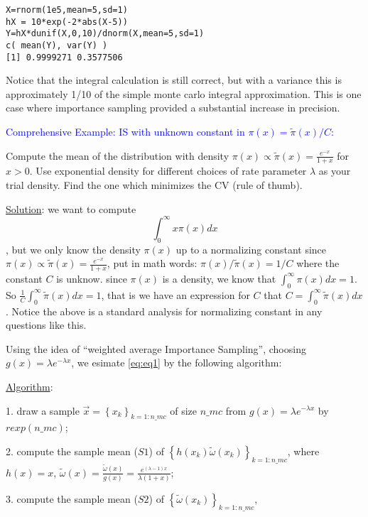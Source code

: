 \documentclass[12pt]{article}
\newcommand{\set}[1]{\left\{#1\right\}}
\numberwithin{equation}{subsection}
\begin{document}
\begin{verbatim}
X=rnorm(1e5,mean=5,sd=1)
hX = 10*exp(-2*abs(X-5))
Y=hX*dunif(X,0,10)/dnorm(X,mean=5,sd=1)
c( mean(Y), var(Y) )
[1] 0.9999271 0.3577506
\end{verbatim}
Notice that the integral calculation is still correct, but with a variance this is approximately
1/10 of the simple monte carlo integral approximation. This is one case where
importance sampling provided a substantial increase in precision. \newline

\noindent
\textcolor{blue}{Comprehensive Example: IS with unknown constant in $\pi(x) = \tilde{\pi}(x) / C$:}

Compute the mean of the distribution with density $\pi(x) \propto \tilde{\pi}(x) = \frac{e^{-x}}{1+ x}$ for $x >0$. Use exponential density for different choices of rate parameter $\lambda$ as your trial density. Find the one which minimizes the CV (rule of thumb).

\underline{Solution}: we want to compute 
\begin{equation}\label{eq:eq1}
\int_0^{\infty} x\pi(x)dx
\end{equation}, but we only know the density $\pi(x)$ up to a normalizing constant since $\pi(x) \propto \tilde{\pi}(x) = \frac{e^{-x}}{1+ x}$, put in math words: $\pi(x) / \tilde{\pi}(x) = 1/C$ where the constant $C$ is unknow. since $\pi(x)$ is a density, we know that $\int_0^{\infty} \pi(x)dx = 1$. So $\frac{1}{C}\int_0^{\infty} \tilde{\pi}(x)dx = 1$, that is we have an expression for $C$ that $C = \int_0^{\infty} \tilde{\pi}(x)dx$. Notice the above is a standard analysis for normalizing constant in any questions like this.

Using the idea of ``weighted average Importance Sampling'', choosing $g(x) = \lambda e^{-\lambda x}$, we esimate \eqref{eq:eq1} by the following algorithm: \newline

\underline{Algorithm}:

1. draw a sample $\vec{x} = \set{x_k}_{k=1:n\_mc}$ of size $n\_mc$ from $g(x) = \lambda e^{-\lambda x}$ by $rexp(n\_mc)$;

2. compute the sample mean ($S1$) of $\set{h(x_k)\tilde{\omega}(x_k)}_{k=1 : n\_mc}$, where $h(x) = x$, $\tilde{\omega}(x) = \frac{\tilde{\omega}(x)}{g(x)} = \frac{e^{(\lambda - 1)x}}{\lambda(1+x)}$;

3. compute the sample mean ($S2$) of $\set{\tilde{\omega}(x_k)}_{k=1 : n\_mc}$, 
\end{document}
